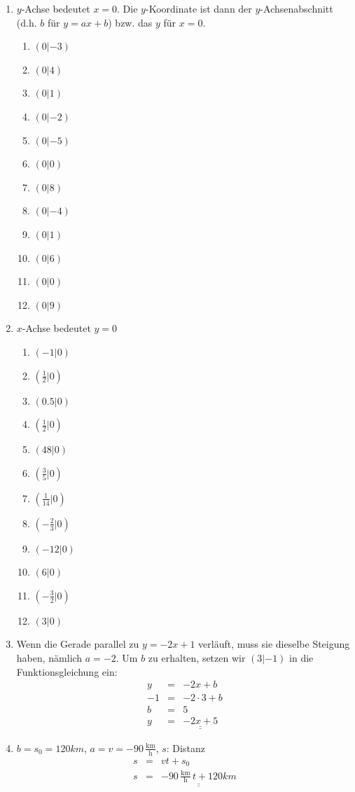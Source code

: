 \documentclass[%
11pt,%
twoside,%
titlepage,%
german,%
headsepline%
]{scrartcl}
\newcommand{\ufrac}[2]{\ensuremath{\,\frac{\mathrm{#1}}{\mathrm{#2}}}}
\newcommand{\result}[1]{\underline{\underline{#1}}}
\begin{document}
{{{\begin{enumerate}
\item $y$-Achse bedeutet $x=0$. Die $y$-Koordinate ist dann der $y$-Achsenabschnitt (d.h. $b$ f\"ur \linebreak $y=ax+b$) bzw. das $y$ f\"ur $x=0$.
  \begin{enumerate}
  \item $(0|-3)$
  \item $(0|4)$
  \item $(0|1)$
  \item $(0|-2)$
  \item $(0|-5)$
  \item $(0|0)$
  \item $(0|8)$
  \item $(0|-4)$
  \item $(0|1)$
  \item $(0|6)$
  \item $(0|0)$
  \item $(0|9)$
  \end{enumerate}
\item $x$-Achse bedeutet $y=0$
  \begin{enumerate}
  \item $(-1|0)$
  \item $(\frac{1}{2}|0)$
  \item $(0.5|0)$
  \item $(\frac{1}{2}|0)$
  \item $(48|0)$
  \item $(\frac{3}{5}|0)$
  \item $(\frac{1}{14}|0)$
  \item $(-\frac{2}{3}|0)$
  \item $(-12|0)$
  \item $(6|0)$
  \item $(-\frac{3}{2}|0)$
  \item $(3|0)$
  \end{enumerate}

\item Wenn die Gerade parallel zu $y=-2x+1$ verl\"auft, muss sie dieselbe Steigung haben, n\"amlich $a=-2$. Um $b$ zu erhalten, setzen wir $(3|-1)$ in die Funktionsgleichung ein:
\begin{eqnarray*}
  y & = & -2x+b \\
  -1 & = & -2 \cdot 3 + b \\
  b & = & 5 \\
  y & = & \result{-2x + 5}
\end{eqnarray*}
  
\item $b=s_0=120\unit{km}$, $a=v=-90\ufrac{km}{h}$, $s$: Distanz
  \begin{eqnarray*}
    s & = & vt + s_0 \\
    s & = & \result{-90\ufrac{km}{h}\,t + 120\unit{km}}
  \end{eqnarray*}


\end{enumerate}}}}
\end{document}
